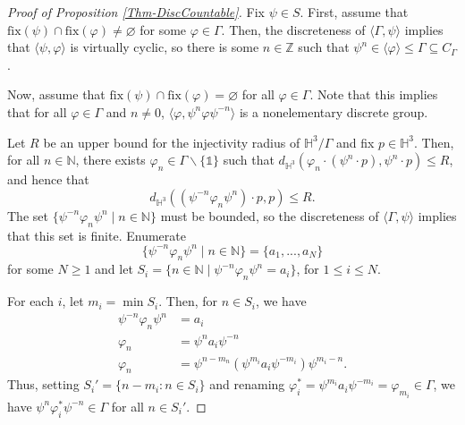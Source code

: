 \documentclass[11pt,leqno]{article}
\theoremstyle{introdef}
\numberwithin{lemma}{section}
\theoremstyle{definition}
\newcommand{\Z}{\mathbb{Z}}
\newcommand{\N}{\mathbb{N}}
\begin{document}
\begin{proof}[Proof of Proposition \ref{Thm-DiscCountable}]
    Fix $\psi\in S$. First, assume that $\mathrm{fix}(\psi)\cap\mathrm{fix}(\varphi)\neq\varnothing$ for some $\varphi\in\Gamma$. Then, the discreteness of $\langle\Gamma,\psi\rangle$ implies that $\langle\psi,\varphi\rangle$ is virtually cyclic, so there is some $n\in\Z$ such that $\psi^n\in\langle\varphi\rangle\leq\Gamma\subseteq C_\Gamma$.\par

    Now, assume that $\mathrm{fix}(\psi)\cap\mathrm{fix}(\varphi)=\varnothing$ for all $\varphi\in\Gamma$. Note that this implies that for all $\varphi\in\Gamma$ and $n\neq 0$, $\langle\varphi,\psi^n\varphi\psi^{-n}\rangle$ is a nonelementary discrete group.\par
    
    Let $R$ be an upper bound for the injectivity radius of $\mathbb{H}^3/\Gamma$ and fix $p\in\mathbb{H}^3$. Then, for all $n\in\N$, there exists $\varphi_n\in\Gamma\backslash\{\mathds{1}\}$ such that $d_{\mathbb{H}^3}(\varphi_n\cdot(\psi^n\cdot p),\psi^n\cdot p)\leq R$, and hence that \[d_{\mathbb{H}^3}((\psi^{-n}\varphi_n\psi^n)\cdot p,p)\leq R.\] The set $\{\psi^{-n}\varphi_n\psi^n \;|\; n\in\N\}$ must be bounded, so the discreteness of $\langle\Gamma,\psi\rangle$ implies that this set is finite. Enumerate \[\{\psi^{-n}\varphi_n\psi^n \;|\; n\in\N\}=\{a_1,...,a_N\}\] for some $N\geq 1$ and let $S_i=\{n\in\N \;|\; \psi^{-n}\varphi_n\psi^n=a_i\}$, for $1\leq i\leq N$.\par

    For each $i$, let $m_i=\min S_i$. Then, for $n\in S_i$, we have 
    \begin{equation*} 
        \begin{split}
            \psi^{-n}\varphi_n\psi^n&=a_i\\
            \varphi_n&=\psi^na_i\psi^{-n}\\
            \varphi_n&=\psi^{n-m_n}(\psi^{m_i}a_i\psi^{-m_i})\psi^{m_i-n}.
        \end{split}
    \end{equation*}
    Thus, setting $S_i'=\{n-m_i:n\in S_i\}$ and renaming $\varphi_i^*=\psi^{m_i}a_i\psi^{-m_i}=\varphi_{m_i}\in\Gamma$, we have $\psi^n\varphi_i^*\psi^{-n}\in\Gamma$ for all $n\in S_i'$.\par


\end{proof}
\end{document}
